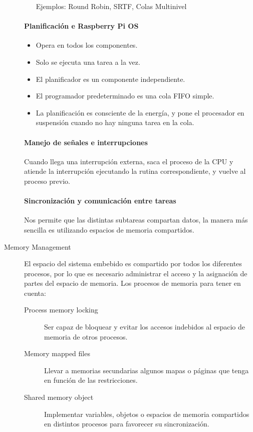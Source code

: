 \documentclass[12pt]{report} %
\begin{document}
\begin{description}
\begin{itemize}
		Ejemplos: Round Robin, SRTF, Colas Multinivel
	\end{itemize}
	
	\paragraph{Planificación e Raspberry Pi OS}
	\begin{itemize}
		\item 	Opera en todos los componentes.
		\item 	Solo se ejecuta una tarea a la vez.
		\item 	El planificador es un componente independiente.
		\item 	El programador predeterminado es una cola FIFO simple.
		\item 	La planificación es consciente de la energía, y pone el procesador en suspensión cuando no hay ninguna tarea en la cola.
	\end{itemize}

	\paragraph{Manejo de señales e interrupciones} Cuando llega una interrupción externa, saca el proceso de la CPU y atiende la interrupción ejecutando la rutina correspondiente, y vuelve al proceso previo.

	\paragraph{Sincronización y comunicación entre tareas} Nos permite que las distintas subtareas compartan datos, la manera más sencilla es utilizando espacios de memoria compartidos.

	\item[Memory Management] El espacio del sistema embebido es compartido por todos los diferentes procesos, por lo que es necesario administrar el acceso y la asignación de partes del espacio de memoria. Los procesos de memoria para tener en cuenta:
	\begin{description}
		\item[Process memory locking] Ser capaz de bloquear y evitar los accesos indebidos al espacio de memoria de otros procesos.
		\item[Memory mapped files] Llevar a memorias secundarias algunos mapas o páginas que tenga en función de las restricciones.
		\item[Shared memory object] Implementar variables, objetos o espacios de memoria compartidos en distintos procesos para favorecer su sincronización.
	\end{description}


\end{description}
\end{document}

